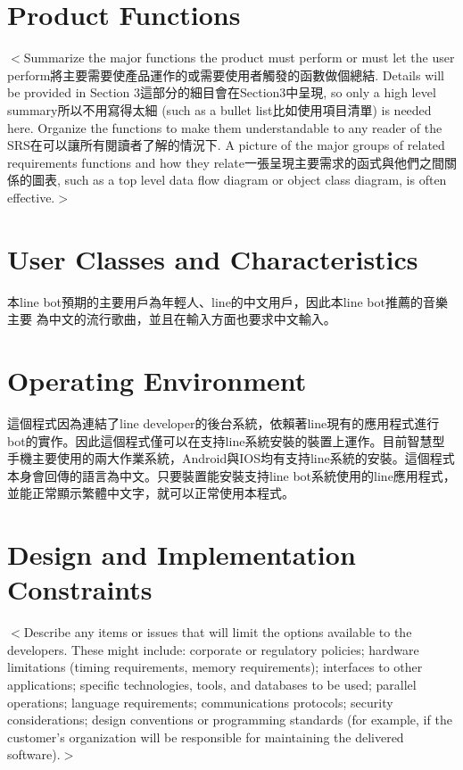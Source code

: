 \documentclass{scrreprt}
\begin{document}
\section{Product Functions}
\begin{CJK}{UTF8}{<font>}
$<$Summarize the major functions the product must perform or must let the user 
perform將主要需要使產品運作的或需要使用者觸發的函數做個總結. Details will be provided in Section 3這部分的細目會在Section3中呈現, so only a high level summary所以不用寫得太細 
(such as a bullet list比如使用項目清單) is needed here. Organize the functions to make them 
understandable to any reader of the SRS在可以讓所有閱讀者了解的情況下. A picture
 of the major groups of 
related requirements functions and how they relate一張呈現主要需求的函式與他們之間關係的圖表, such as a top level data flow diagram 
or object class diagram, is often effective.$>$
\end{CJK}

\section{User Classes and Characteristics}
\begin{CJK}{UTF8}{<font>}
本line bot預期的主要用戶為年輕人、line的中文用戶，因此本line bot推薦的音樂主要
為中文的流行歌曲，並且在輸入方面也要求中文輸入。
\end{CJK}

\section{Operating Environment}
\begin{CJK}{UTF8}{<font>}
這個程式因為連結了line developer的後台系統，依賴著line現有的應用程式進行bot的實作。因此這個程式僅可以在支持line系統安裝的裝置上運作。目前智慧型手機主要使用的兩大作業系統，Android與IOS均有支持line系統的安裝。這個程式本身會回傳的語言為中文。只要裝置能安裝支持line bot系統使用的line應用程式，並能正常顯示繁體中文字，就可以正常使用本程式。
\end{CJK}

\section{Design and Implementation Constraints}
\begin{CJK}{UTF8}{<font>}
$<$Describe any items or issues that will limit the options available to the 
developers. These might include: corporate or regulatory policies; hardware 
limitations (timing requirements, memory requirements); interfaces to other 
applications; specific technologies, tools, and databases to be used; parallel 
operations; language requirements; communications protocols; security 
considerations; design conventions or programming standards (for example, if the 
customer’s organization will be responsible for maintaining the delivered 
software).$>$
\end{CJK}
\end{document}
